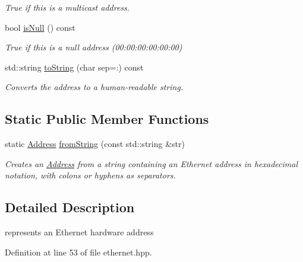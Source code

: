 \begin{DoxyCompactItemize}
\begin{DoxyCompactList}\small\item\em True if this is a multicast address. \end{DoxyCompactList}\item 
bool \hyperlink{classndn_1_1util_1_1ethernet_1_1Address_a45e7b0d3314801c60aecfa0bb8744de7}{is\+Null} () const\hypertarget{classndn_1_1util_1_1ethernet_1_1Address_a45e7b0d3314801c60aecfa0bb8744de7}{}\label{classndn_1_1util_1_1ethernet_1_1Address_a45e7b0d3314801c60aecfa0bb8744de7}

\begin{DoxyCompactList}\small\item\em True if this is a null address (00\+:00\+:00\+:00\+:00\+:00) \end{DoxyCompactList}\item 
std\+::string \hyperlink{classndn_1_1util_1_1ethernet_1_1Address_a84377159293ae92142f41482e41aeeeb}{to\+String} (char sep=\textquotesingle{}\+:\textquotesingle{}) const
\begin{DoxyCompactList}\small\item\em Converts the address to a human-\/readable string. \end{DoxyCompactList}\end{DoxyCompactItemize}
\subsection*{Static Public Member Functions}
\begin{DoxyCompactItemize}
\item 
static \hyperlink{classndn_1_1util_1_1ethernet_1_1Address}{Address} \hyperlink{classndn_1_1util_1_1ethernet_1_1Address_a3e7b9517a8e47a4f9cee785d27606ff1}{from\+String} (const std\+::string \&str)
\begin{DoxyCompactList}\small\item\em Creates an \hyperlink{classndn_1_1util_1_1ethernet_1_1Address}{Address} from a string containing an Ethernet address in hexadecimal notation, with colons or hyphens as separators. \end{DoxyCompactList}\end{DoxyCompactItemize}


\subsection{Detailed Description}
represents an Ethernet hardware address 

Definition at line 53 of file ethernet.\+hpp.



